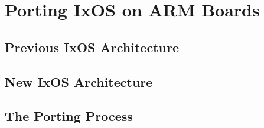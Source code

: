 \section{Porting IxOS on ARM Boards}
\subsection{Previous IxOS Architecture}
\subsection{New IxOS Architecture}
\subsection{The Porting Process}
